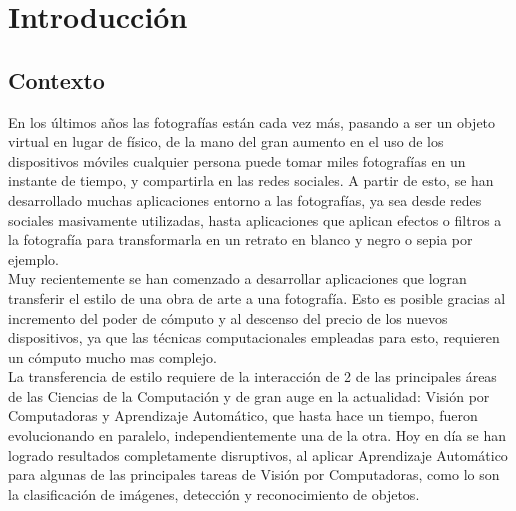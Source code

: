 \documentclass[a4paper,11pt,spanish]{book}
\begin{document}
\tableofcontents

\chapter{Introducción}
  \section {Contexto}
    En los últimos años las fotografías están cada vez más, pasando a ser un objeto virtual en lugar de físico, de la mano del gran aumento en el uso de los dispositivos móviles
    cualquier persona puede tomar miles fotografías en un instante de tiempo, y compartirla en las redes sociales.
    A partir de esto, se han desarrollado muchas aplicaciones entorno a las fotografías, ya sea desde redes sociales masivamente utilizadas, hasta aplicaciones que aplican efectos o filtros
    a la fotografía para transformarla en un retrato en blanco y negro o sepia por ejemplo. \\
    Muy recientemente se han comenzado a desarrollar aplicaciones que logran transferir el estilo de una obra de arte a una fotografía. Esto es posible gracias al incremento
    del poder de cómputo y al descenso del precio de los nuevos dispositivos, ya que las técnicas computacionales empleadas para esto, requieren un cómputo mucho mas complejo.\\
    La transferencia de estilo requiere de la interacción de 2 de las principales áreas de las Ciencias de la Computación y de gran auge en la actualidad: Visión por Computadoras y Aprendizaje Automático,
    que hasta hace un tiempo, fueron evolucionando en paralelo, independientemente una de la otra. Hoy en día se han logrado resultados completamente disruptivos, al aplicar
    Aprendizaje Automático para algunas de las principales tareas de Visión por Computadoras, como lo son la clasificación de imágenes, detección y reconocimiento de objetos.
\end{document}
